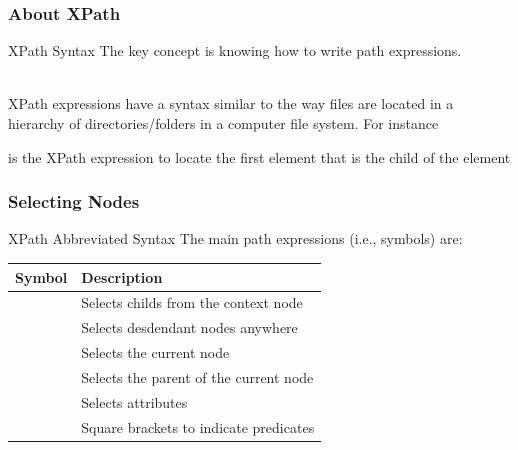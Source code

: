 \documentclass[svgnames]{beamer}
\begin{document}
\begin{frame}[fragile]
\frametitle{About XPath}

\begin{block}{XPath Syntax}
The key concept is knowing how to write path expressions.

~\\

XPath expressions have a syntax similar to the way files are located in a hierarchy of directories/folders in a computer file system. For instance


\bigskip 
\begin{center}
\end{center}
\bigskip
is the XPath expression to locate the first {\hilit {}} element that is the child of the {\hilit {}} element
\end{block}
\end{frame}


\begin{frame}
\frametitle{Selecting Nodes}

\begin{block}{XPath Abbreviated Syntax}
The main path expressions (i.e., symbols) are:
\end{block}

\begin{center}
 \begin{tabular}{l l}
  \hline
  Symbol & Description \\
  \hline
  \code{/} & Selects childs from the context node \\
  \code{//} & Selects desdendant nodes anywhere \\
  \code{.} & Selects the current node \\
  \code{..} & Selects the parent of the current node \\
  \code{@} & Selects attributes \\
  \code{[]} & Square brackets to indicate predicates \\
  \hline
 \end{tabular}
\end{center}

\end{frame}

\end{document}
